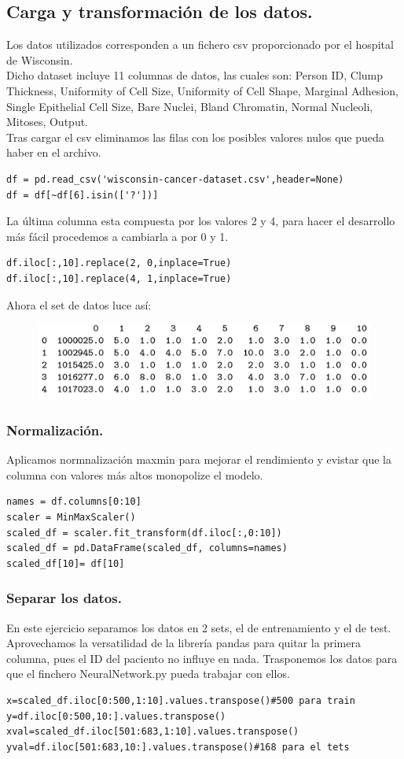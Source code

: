 \documentclass[a4paper,10pt]{article}
\begin{document}
\subsection{Carga y transformación de los datos.}
Los datos utilizados corresponden a un fichero csv proporcionado por el hospital de Wisconsin.\\
Dicho dataset incluye 11 columnas de datos, las cuales son: Person ID, Clump Thickness, Uniformity of Cell Size, Uniformity of Cell Shape, Marginal Adhesion, Single Epithelial Cell Size, Bare Nuclei, Bland Chromatin, Normal Nucleoli, Mitoses, Output.\\
Tras cargar el csv eliminamos las filas con los posibles valores nulos que pueda haber en el archivo.
\begin{lstlisting}
df = pd.read_csv('wisconsin-cancer-dataset.csv',header=None)
df = df[~df[6].isin(['?'])]
\end{lstlisting}
La última columna esta compuesta por los valores 2 y 4,  para hacer el desarrollo más fácil procedemos a cambiarla a por 0 y 1.
\begin{lstlisting}
df.iloc[:,10].replace(2, 0,inplace=True)
df.iloc[:,10].replace(4, 1,inplace=True)
\end{lstlisting}
Ahora el set de datos luce así: 
\begin{figure}[H]
\centering
\includegraphics{Annotation 2020-03-23 185932.png}
\end{figure}
\subsubsection{Normalización.}
Aplicamos normnalización maxmin para mejorar el rendimiento y evistar que la columna con valores más altos monopolize el modelo. 
\begin{lstlisting}
names = df.columns[0:10]
scaler = MinMaxScaler() 
scaled_df = scaler.fit_transform(df.iloc[:,0:10]) 
scaled_df = pd.DataFrame(scaled_df, columns=names)
scaled_df[10]= df[10]
\end{lstlisting}
\subsubsection{Separar los datos.}
En este ejercicio separamos los datos en 2 sets, el de entrenamiento y el de test. Aprovechamos la versatilidad de la librería pandas para quitar la primera columna, pues el ID del paciento no influye en nada. Trasponemos los datos para que el finchero NeuralNetwork.py pueda trabajar con ellos.
\begin{lstlisting}
x=scaled_df.iloc[0:500,1:10].values.transpose()#500 para train
y=df.iloc[0:500,10:].values.transpose()
xval=scaled_df.iloc[501:683,1:10].values.transpose()
yval=df.iloc[501:683,10:].values.transpose()#168 para el tets
\end{lstlisting}
\end{document}
